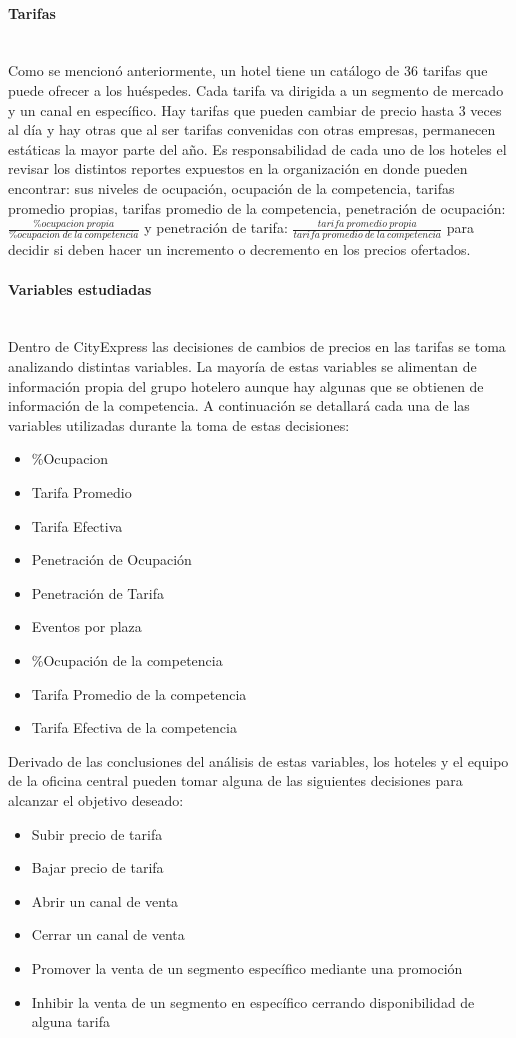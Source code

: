 \documentclass[a4paper,11pt]{article}
\begin{document}
\paragraph{Tarifas} ~\\
Como se mencionó anteriormente, un hotel tiene un catálogo de 36 tarifas que puede ofrecer a los huéspedes. Cada tarifa va dirigida a un segmento de mercado y un canal en específico. Hay tarifas que pueden cambiar de precio hasta 3 veces al día y hay otras que al ser tarifas convenidas con otras empresas, permanecen estáticas la mayor parte del año.
Es responsabilidad de cada uno de los hoteles el revisar los distintos reportes expuestos en la organización en donde pueden encontrar: sus niveles de ocupación, ocupación de la competencia, tarifas promedio propias, tarifas promedio de la competencia, penetración de ocupación: $\frac{\% ocupacion\ propia}{ \% ocupacion\ de\ la\ competencia}$ y penetración de tarifa: $\frac{tarifa\ promedio\ propia}{tarifa\ promedio\ de\ la\ competencia}$ para decidir si deben hacer un incremento o decremento en los precios ofertados.
\paragraph{Variables estudiadas} ~\\
Dentro de CityExpress las decisiones de cambios de precios en las tarifas se toma analizando distintas variables. La mayoría de estas variables se alimentan de información propia del grupo hotelero aunque hay algunas que se obtienen de información de la competencia. A continuación se detallará cada una de las variables utilizadas durante la toma de estas decisiones:
\begin{itemize}[noitemsep]
\item \%Ocupacion
\item Tarifa Promedio
\item Tarifa Efectiva
\item Penetración de Ocupación
\item Penetración de Tarifa
\item Eventos por plaza
\item \%Ocupación de la competencia
\item Tarifa Promedio de la competencia
\item Tarifa Efectiva de la competencia
\end{itemize}
Derivado de las conclusiones del análisis de estas variables, los hoteles y el equipo de la oficina central pueden tomar alguna de las siguientes decisiones para alcanzar el objetivo deseado:
\begin{itemize}[noitemsep]
\item Subir precio de tarifa
\item Bajar precio de tarifa
\item Abrir un canal de venta
\item Cerrar un canal de venta
\item Promover la venta de un segmento específico mediante una promoción
\item Inhibir la venta de un segmento en específico cerrando disponibilidad de alguna tarifa
\end{itemize}
\end{document}
